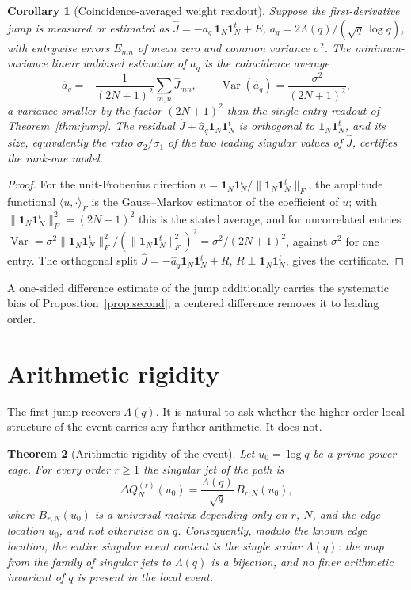 \documentclass[11pt]{article}
\theoremstyle{plain}
\newtheorem{theorem}{Theorem}[section]
\newtheorem{corollary}[theorem]{Corollary}
\theoremstyle{definition}
\theoremstyle{remark}
\newcommand{\one}{\mathbf 1}
\newcommand{\Lam}{\Lambda}
\begin{document}
\begin{corollary}[Coincidence-averaged weight readout]\label{cor:matched}
Suppose the first-derivative jump is measured or estimated as
$\widehat{J}=-a_q\,\one_N\one_N^t+E$, $a_q=2\Lam(q)/(\sqrt q\,\log q)$, with
entrywise errors $E_{mn}$ of mean zero and common variance $\sigma^2$. The
minimum-variance linear unbiased estimator of $a_q$ is the coincidence average
\[
        \widehat a_q=-\frac{1}{(2N+1)^2}\sum_{m,n}\widehat{J}_{mn},
        \qquad \operatorname{Var}(\widehat a_q)=\frac{\sigma^2}{(2N+1)^2},
\]
a variance smaller by the factor $(2N+1)^2$ than the single-entry readout of
Theorem~\ref{thm:jump}. The residual $\widehat{J}+\widehat a_q\one_N\one_N^t$ is
orthogonal to $\one_N\one_N^t$, and its size, equivalently the ratio
$\sigma_2/\sigma_1$ of the two leading singular values of $\widehat{J}$, certifies
the rank-one model.
\end{corollary}

\begin{proof}
For the unit-Frobenius direction $u=\one_N\one_N^t/\|\one_N\one_N^t\|_F$, the
amplitude functional $\langle u,\cdot\rangle_F$ is the Gauss--Markov estimator of
the coefficient of $u$; with $\|\one_N\one_N^t\|_F^2=(2N+1)^2$ this is the stated
average, and for uncorrelated entries
$\operatorname{Var}=\sigma^2\|\one_N\one_N^t\|_F^2/(\|\one_N\one_N^t\|_F^2)^2
=\sigma^2/(2N+1)^2$, against $\sigma^2$ for one entry. The orthogonal split
$\widehat{J}=-\widehat a_q\one_N\one_N^t+R$, $R\perp\one_N\one_N^t$, gives the
certificate.
\end{proof}

\noindent A one-sided difference estimate of the jump additionally carries the
systematic bias of Proposition~\ref{prop:second}; a centered difference removes it
to leading order.

\section{Arithmetic rigidity}\label{sec:rigidity}

The first jump recovers $\Lam(q)$. It is natural to ask whether the higher-order
local structure of the event carries any further arithmetic. It does not.

\begin{theorem}[Arithmetic rigidity of the event]\label{thm:rigidity}
Let $u_0=\log q$ be a prime-power edge. For every order $r\ge1$ the singular jet
of the path is
\[
        \Delta Q_N^{(r)}(u_0)=\frac{\Lam(q)}{\sqrt q}\,B_{r,N}(u_0),
\]
where $B_{r,N}(u_0)$ is a universal matrix depending only on $r$, $N$, and the
edge location $u_0$, and not otherwise on $q$. Consequently, modulo the known
edge location, the entire singular event content is the single scalar $\Lam(q)$:
the map from the family of singular jets to $\Lam(q)$ is a bijection, and no
finer arithmetic invariant of $q$ is present in the local event.
\end{theorem}
\end{document}
